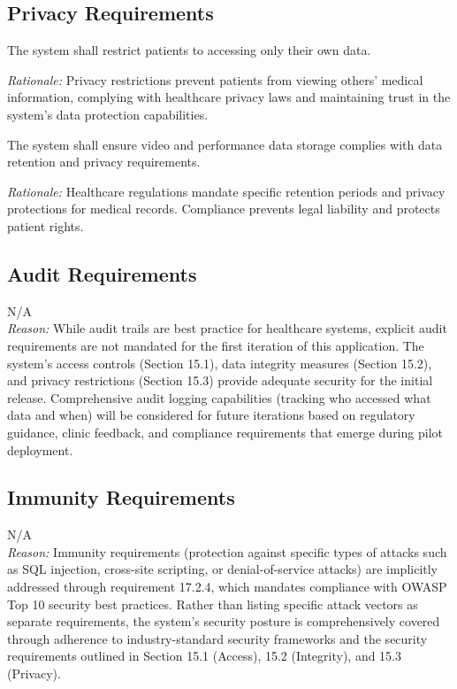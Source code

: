 \documentclass[12pt]{article}
\newcommand{\rationale}[1]{\par\emph{Rationale:} #1}
\begin{document}
\subsection{Privacy Requirements}
\begin{reqlist}
	\item[SR-PR 1.] The system shall restrict patients to accessing only their own data.
	\rationale{Privacy restrictions prevent patients from viewing others' medical information, complying with healthcare privacy laws and maintaining trust in the system's data protection capabilities.}
	
	\item[SR-PR 2.] The system shall ensure video and performance data storage complies with data retention and privacy requirements.
	\rationale{Healthcare regulations mandate specific retention periods and privacy protections for medical records. Compliance prevents legal liability and protects patient rights.}
\end{reqlist}

\subsection{Audit Requirements}
\noindent N/A \\
\textit{Reason:} While audit trails are best practice for healthcare systems, explicit audit requirements are not mandated for the first iteration of this application. The system's access controls (Section 15.1), data integrity measures (Section 15.2), and privacy restrictions (Section 15.3) provide adequate security for the initial release. Comprehensive audit logging capabilities (tracking who accessed what data and when) will be considered for future iterations based on regulatory guidance, clinic feedback, and compliance requirements that emerge during pilot deployment.

\subsection{Immunity Requirements}
\noindent N/A \\
\textit{Reason:} Immunity requirements (protection against specific types of attacks such as SQL injection, cross-site scripting, or denial-of-service attacks) are implicitly addressed through requirement 17.2.4, which mandates compliance with OWASP Top 10 security best practices. Rather than listing specific attack vectors as separate requirements, the system's security posture is comprehensively covered through adherence to industry-standard security frameworks and the security requirements outlined in Section 15.1 (Access), 15.2 (Integrity), and 15.3 (Privacy).
\end{document}
